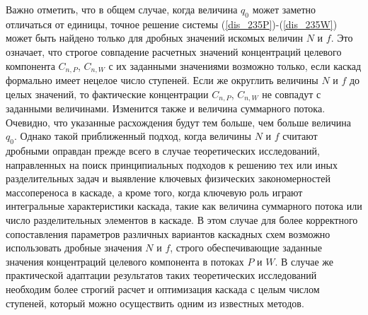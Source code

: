 Важно отметить, что в общем случае, когда величина $q_0$ может заметно отличаться от единицы, точное решение системы (\ref{dis_235P})-(\ref{dis_235W}) может быть найдено только для дробных значений искомых величин $N$ и $f$. Это означает, что строгое совпадение расчетных значений концентраций целевого компонента $C_{n,P}$, $C_{n,W}$ с их заданными значениями возможно только, если каскад формально имеет нецелое число ступеней. Если же округлить величины $N$ и $f$ до целых значений, то  фактические концентрации $C_{n,P}$, $C_{n,W}$ не совпадут с заданными величинами. Изменится также и величина суммарного потока. Очевидно, что указанные расхождения будут тем больше, чем больше величина $q_0$. Однако такой приближенный подход, когда величины $N$ и $f$ считают дробными оправдан прежде всего в случае теоретических исследований, направленных на поиск принципиальных подходов к решению тех или иных разделительных задач и выявление ключевых физических закономерностей массопереноса в каскаде, а кроме того, когда ключевую роль играют интегральные характеристики каскада, такие как величина суммарного потока или число разделительных элементов в каскаде. В этом случае для более корректного сопоставления параметров различных вариантов каскадных схем возможно использовать дробные значения $N$ и $f$, строго обеспечивающие заданные значения концентраций целевого компонента в потоках $P$ и $W$. В случае же практической адаптации результатов таких теоретических исследований необходим более строгий расчет и оптимизация каскада с целым числом ступеней, который можно осуществить одним из известных методов. 
